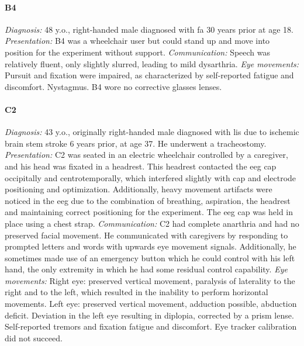 \paragraph{B4}
\emph{Diagnosis:} 48 y.o., right-handed male diagnosed with \ac{fa} 30 years
prior at age 18.
\emph{Presentation:} B4 was a wheelchair user but could stand up and move into
position for the experiment without support.
\emph{Communication:} Speech was relatively fluent, only slightly slurred,
leading to mild dysarthria.
\emph{Eye movements:} Pursuit and fixation were impaired, as characterized by
self-reported fatigue and discomfort. Nystagmus. B4 wore no corrective glasses lenses.

\paragraph{C2}
\emph{Diagnosis:} 43 y.o., originally right-handed male diagnosed with \ac{lis} due to
ischemic brain stem stroke 6 years prior, at age 37. He underwent a tracheostomy.
\emph{Presentation:} C2 was seated in an electric wheelchair controlled by a
caregiver, and his head was fixated in a headrest.
This headrest contacted the \ac{eeg} cap occipitally and centrotemporally, which
interfered slightly with cap and electrode positioning and optimization.
Additionally, heavy movement artifacts were noticed in the \ac{eeg} due to the
combination of breathing, aspiration, the headrest and maintaining correct
positioning for the experiment.
The \ac{eeg} cap was held in place using a chest strap.
\emph{Communication:} C2 had complete anarthria and had no preserved facial
movement. He communicated with caregivers by responding to prompted letters and
words with upwards eye movement signals.
Additionally, he sometimes made use of an emergency button which he could
control with his left hand, the only extremity in which he had some residual
control capability.
\emph{Eye movements:}
Right eye: preserved vertical movement, paralysis of laterality to the right and to the left,
which resulted in the inability to perform horizontal movements.
Left eye: preserved vertical movement, adduction possible, abduction deficit.
Deviation in the left eye resulting in diplopia, corrected by a prism lense.
Self-reported tremors and fixation fatigue and discomfort.
Eye tracker calibration did not succeed.

